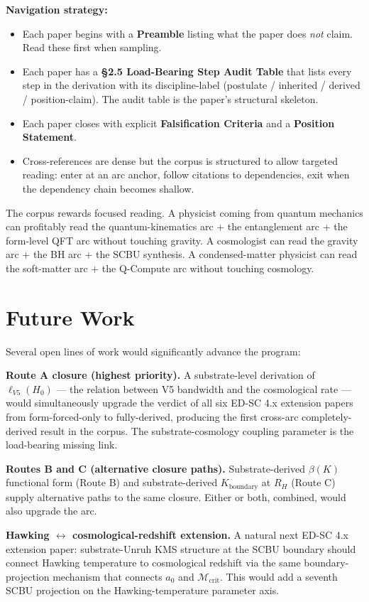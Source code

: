 \documentclass[11pt,a4paper]{article}
\begin{document}
\textbf{Navigation strategy:}

\begin{itemize}[noitemsep]
\item Each paper begins with a \textbf{Preamble} listing what the paper does \emph{not} claim. Read these first when sampling.
\item Each paper has a \textbf{\S2.5 Load-Bearing Step Audit Table} that lists every step in the derivation with its discipline-label (postulate / inherited / derived / position-claim). The audit table is the paper's structural skeleton.
\item Each paper closes with explicit \textbf{Falsification Criteria} and a \textbf{Position Statement}.
\item Cross-references are dense but the corpus is structured to allow targeted reading: enter at an arc anchor, follow citations to dependencies, exit when the dependency chain becomes shallow.
\end{itemize}

The corpus rewards focused reading. A physicist coming from quantum mechanics can profitably read the quantum-kinematics arc + the entanglement arc + the form-level QFT arc without touching gravity. A cosmologist can read the gravity arc + the BH arc + the SCBU synthesis. A condensed-matter physicist can read the soft-matter arc + the Q-Compute arc without touching cosmology.

\section{Future Work}

Several open lines of work would significantly advance the program:

\textbf{Route A closure (highest priority).} A substrate-level derivation of $\ell_{V5}(H_0)$ --- the relation between V5 bandwidth and the cosmological rate --- would simultaneously upgrade the verdict of all six ED-SC 4.x extension papers from form-forced-only to fully-derived, producing the first cross-arc completely-derived result in the corpus. The substrate-cosmology coupling parameter is the load-bearing missing link.

\textbf{Routes B and C (alternative closure paths).} Substrate-derived $\beta(K)$ functional form (Route B) and substrate-derived $K_\mathrm{boundary}$ at $R_H$ (Route C) supply alternative paths to the same closure. Either or both, combined, would also upgrade the arc.

\textbf{Hawking $\leftrightarrow$ cosmological-redshift extension.} A natural next ED-SC 4.x extension paper: substrate-Unruh KMS structure at the SCBU boundary should connect Hawking temperature to cosmological redshift via the same boundary-projection mechanism that connects $a_0$ and $\mathcal{M}_\mathrm{crit}$. This would add a seventh SCBU projection on the Hawking-temperature parameter axis.
\end{document}
